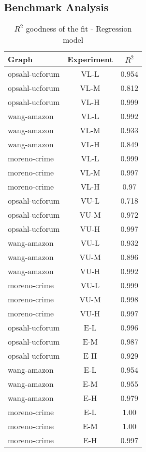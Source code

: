 \subsection{Benchmark Analysis}\label{app:exp:bench}
\begin{longtable}{|l|c|c|}
  \caption{$R^2$ goodness of the fit - Regression model}
  \label{table:app:exp:bench}\\
    \hline
   \textbf{Graph} & \textbf{Experiment} & \textbf{$R^2$}\\
   \hline
   opsahl-ucforum & VL-L & 0.954 \\
   \hline
   opsahl-ucforum & VL-M & 0.812 \\
   \hline
   opsahl-ucforum & VL-H & 0.999 \\
   \hline
   wang-amazon & VL-L & 0.992 \\
   \hline
   wang-amazon & VL-M & 0.933 \\
   \hline
   wang-amazon & VL-H & 0.849 \\
   \hline
   moreno-crime & VL-L & 0.999 \\
   \hline
   moreno-crime & VL-M & 0.997 \\
   \hline
   moreno-crime & VL-H & 0.97 \\
   \hline
   opsahl-ucforum & VU-L & 0.718 \\
   \hline
   opsahl-ucforum & VU-M & 0.972 \\
   \hline
   opsahl-ucforum & VU-H & 0.997 \\
   \hline
   wang-amazon & VU-L & 0.932 \\
   \hline
   wang-amazon & VU-M & 0.896 \\
   \hline
   wang-amazon & VU-H & 0.992 \\
   \hline
   moreno-crime & VU-L & 0.999 \\
   \hline
   moreno-crime & VU-M & 0.998 \\
   \hline
   moreno-crime & VU-H & 0.997 \\
   \hline
   opsahl-ucforum & E-L & 0.996 \\
   \hline
   opsahl-ucforum & E-M & 0.987 \\
   \hline
   opsahl-ucforum & E-H & 0.929 \\
   \hline
   wang-amazon & E-L & 0.954 \\
   \hline
   wang-amazon & E-M & 0.955 \\
   \hline
   wang-amazon & E-H & 0.979 \\
   \hline
   moreno-crime & E-L & 1.00 \\
   \hline
   moreno-crime & E-M & 1.00 \\
   \hline
   moreno-crime & E-H & 0.997 \\
   \hline
 \end{longtable}

